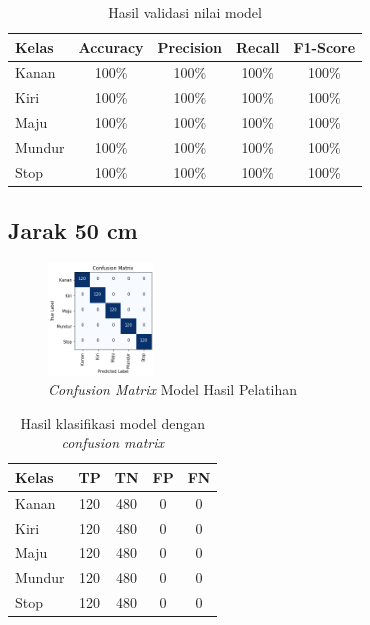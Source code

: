 \begin{longtable}{|l|c|c|c|c|}
  \caption{Hasil validasi nilai model}
  \label{tb:vs_model2} \\
  \hline
  \rowcolor[HTML]{C0C0C0} 
  \textbf{Kelas} & \textbf{Accuracy} & \textbf{Precision} & \textbf{Recall} & \textbf{F1-Score} \\ \hline
  Kanan    & 100\%            & 100\%             & 100\%           & 100\%            \\ \hline
  Kiri     & 100\%          & 100\%           & 100\%           & 100\%           \\ \hline
  Maju      & 100\%          & 100\%           & 100\%          & 100\%          \\ \hline
  Mundur     & 100\%            & 100\%             & 100\%           & 100\%            \\ \hline
  Stop  & 100\%            & 100\%             & 100\%           & 100\%            \\ \hline
\end{longtable}

\subsection{Jarak 50 cm}

\begin{figure} [ht] \centering
  \includegraphics[width=0.25\textwidth]{gambar/bab4/model6 (50cm)/matrix.png}
  \caption{\emph{Confusion Matrix} Model Hasil Pelatihan}
  \label{fig:matrix3}
\end{figure}

\begin{longtable}{|l|c|c|c|c|}
  \caption{Hasil klasifikasi model dengan \emph{confusion matrix}}
  \label{tb:cm_model3} \\
  \hline
  \rowcolor[HTML]{C0C0C0} 
  \textbf{Kelas} & \textbf{TP} & \textbf{TN} & \textbf{FP} & \textbf{FN} \\ \hline
  Kanan    & 120          & 480         & 0           & 0           \\ \hline
  Kiri      & 120          & 480         & 0           & 0           \\ \hline
  Maju      & 120          & 480         & 0           & 0           \\ \hline
  Mundur     & 120          & 480         & 0           & 0           \\ \hline
  Stop  & 120          & 480         & 0           & 0           \\ \hline
\end{longtable}

